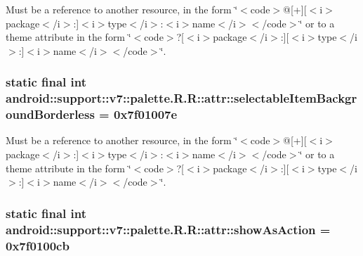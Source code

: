 Must be a reference to another resource, in the form \char`\"{}$<$code$>$@\mbox{[}+\mbox{]}\mbox{[}$<$i$>$package$<$/i$>$:\mbox{]}$<$i$>$type$<$/i$>$:$<$i$>$name$<$/i$>$$<$/code$>$\char`\"{} or to a theme attribute in the form \char`\"{}$<$code$>$?\mbox{[}$<$i$>$package$<$/i$>$:\mbox{]}\mbox{[}$<$i$>$type$<$/i$>$:\mbox{]}$<$i$>$name$<$/i$>$$<$/code$>$\char`\"{}. \hypertarget{classandroid_1_1support_1_1v7_1_1palette_1_1_r_1_1attr_c3e9dc2e2b988e2843ffb17f31ee9eb4}{
\subsubsection[{selectableItemBackgroundBorderless}]{\setlength{\rightskip}{0pt plus 5cm}static final int android::support::v7::palette.R.R::attr::selectableItemBackgroundBorderless = 0x7f01007e}}
\label{classandroid_1_1support_1_1v7_1_1palette_1_1_r_1_1attr_c3e9dc2e2b988e2843ffb17f31ee9eb4}


Must be a reference to another resource, in the form \char`\"{}$<$code$>$@\mbox{[}+\mbox{]}\mbox{[}$<$i$>$package$<$/i$>$:\mbox{]}$<$i$>$type$<$/i$>$:$<$i$>$name$<$/i$>$$<$/code$>$\char`\"{} or to a theme attribute in the form \char`\"{}$<$code$>$?\mbox{[}$<$i$>$package$<$/i$>$:\mbox{]}\mbox{[}$<$i$>$type$<$/i$>$:\mbox{]}$<$i$>$name$<$/i$>$$<$/code$>$\char`\"{}. \hypertarget{classandroid_1_1support_1_1v7_1_1palette_1_1_r_1_1attr_39d56b31baae0112ca355baf7de9d0ad}{
\subsubsection[{showAsAction}]{\setlength{\rightskip}{0pt plus 5cm}static final int android::support::v7::palette.R.R::attr::showAsAction = 0x7f0100cb}}
\label{classandroid_1_1support_1_1v7_1_1palette_1_1_r_1_1attr_39d56b31baae0112ca355baf7de9d0ad}



